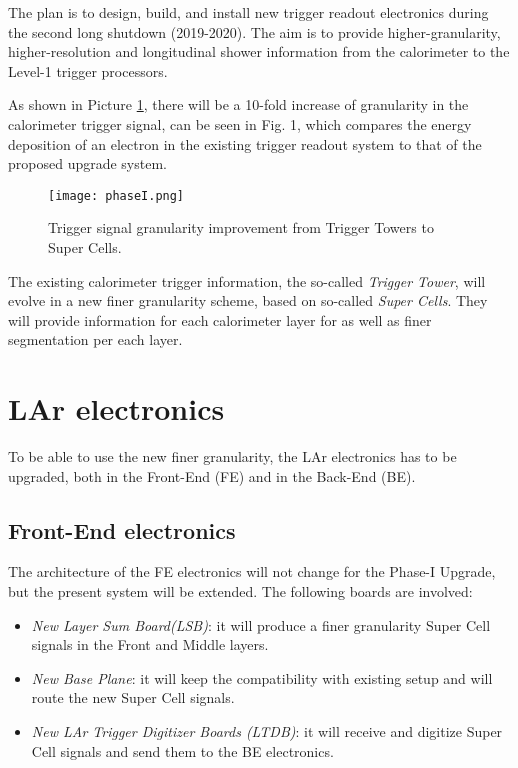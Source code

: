 \documentclass{llncs}
\begin{document}
The plan is to design, build, and install new trigger readout electronics during the second long shutdown (2019-2020). The aim is to   provide higher-granularity, higher-resolution and longitudinal shower information from the calorimeter to the Level-1 trigger processors.

As shown in Picture \ref{fig:PhaseI}, there will be a 10-fold increase
of granularity in the calorimeter trigger signal, can be seen in Fig. 1, which compares the energy deposition of an electron in the
existing trigger readout system to that of the proposed upgrade system. 

\begin{figure}[t]
	\centering	
	\texttt{[image: phaseI.png]}
	\caption{Trigger signal granularity improvement from Trigger Towers to Super Cells.}
	\label{fig:PhaseI}
\end{figure}

The existing calorimeter trigger information, the so-called \emph{Trigger Tower}, will evolve in a new finer granularity scheme, based on so-called \emph{Super Cells}. They will provide information
for each calorimeter layer for as well as finer segmentation per each layer. \cite{Aleksa:1602230}

\section{LAr electronics}
To be able to use the new finer granularity, the LAr electronics has to be upgraded, both in the Front-End (FE) and in the Back-End (BE).

\subsection{Front-End electronics}
The architecture of the FE electronics will not change for the Phase-I Upgrade, but the present system will be extended. The following boards are involved:

\begin{itemize}
\item \emph{New Layer Sum Board(LSB)}: it will produce a finer granularity Super Cell signals in the Front and Middle layers.
\item \emph{New Base Plane}: it will keep the compatibility with existing setup and will route the new Super Cell signals.
\item \emph{New LAr Trigger Digitizer Boards (LTDB)}: it will receive and digitize Super Cell signals and send them to the BE electronics.
\end{itemize}
\end{document}
